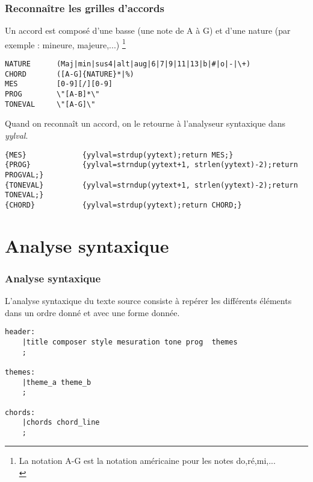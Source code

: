 \documentclass{beamer}
\begin{document}
\begin{frame}[fragile]
\frametitle{Reconnaître les grilles d'accords}
Un accord est composé d'une basse (une note de A à G) et d'une nature (par exemple : mineure, majeure,...)
\footnote{\tiny{La notation A-G est la notation américaine pour les notes do,ré,mi,...}\\}
\begin{tiny}
\begin{verbatim}
NATURE      (Maj|min|sus4|alt|aug|6|7|9|11|13|b|#|o|-|\+)
CHORD       ([A-G]{NATURE}*|%)
MES         [0-9][/][0-9]
PROG        \"[A-B]*\"
TONEVAL     \"[A-G]\"
\end{verbatim}
\end{tiny}

Quand on reconnaît un accord, on le retourne à l'analyseur syntaxique dans \textit{yylval}.
\begin{tiny}
\begin{verbatim}
{MES}             {yylval=strdup(yytext);return MES;}
{PROG}            {yylval=strndup(yytext+1, strlen(yytext)-2);return PROGVAL;}
{TONEVAL}         {yylval=strndup(yytext+1, strlen(yytext)-2);return TONEVAL;}
{CHORD}           {yylval=strdup(yytext);return CHORD;}
\end{verbatim}
\end{tiny}

\end{frame}




\section{Analyse syntaxique}
\begin{frame}[fragile]
\frametitle{Analyse syntaxique}
L'analyse syntaxique du texte source consiste à repérer les différents éléments dans un ordre donné et avec une forme donnée.

\begin{tiny}
\begin{verbatim}
header:
	|title composer style mesuration tone prog  themes
	;

themes:
	|theme_a theme_b
	;

chords:
	|chords chord_line
	;
\end{verbatim}
\end{tiny}

\end{frame}
\end{document}
